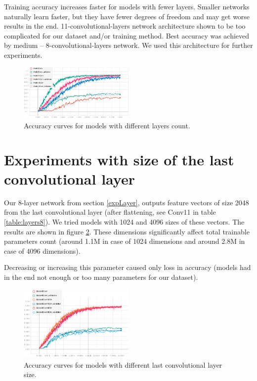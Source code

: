 \documentclass[a4paper]{article}
\begin{document}
Training accuracy increases faster for models with fewer layers.
Smaller networks naturally learn faster, but they have fewer degrees of freedom
and may get worse results in the end.
11-convolutional-layers network architecture shown to be too complicated for
our dataset and/or training method.
Best accuracy was achieved by medium -- 8-convolutional-layers network.
We used this architecture for further experiments.

\begin{figure}[!h]
    \centering
    \includegraphics[page=2,width=0.5\textwidth]{curvesLayers.png}
    \caption[]{Accuracy curves for models with different layers count.
    \label{fig:layersAcc}
   	}
\end{figure}

\section{Experiments with size of the last convolutional layer}

Our 8-layer network from section \ref{expLayer}, outputs
feature vectors of size 2048 from the last convolutional layer (after flattening, see Conv11 in table \ref{table:layers8}).
We tried models with 1024 and 4096 sizes of these vectors.
The results are shown in figure \ref{fig:lastSize}.
These dimensions significantly affect total trainable parameters count
(around 1.1M in case of 1024 dimensions and around 2.8M in case of 4096 dimensions).

Decreasing or increasing this parameter caused only loss in accuracy
(models had in the end not enough or too many parameters for our dataset).

\begin{figure}[!h]
    \centering
    \includegraphics[page=2,width=0.5\textwidth]{lastConvSize.png}
    \caption[]{Accuracy curves for models with different last convolutional layer size.
    \label{fig:lastSize}
    }
\end{figure}
\end{document}
